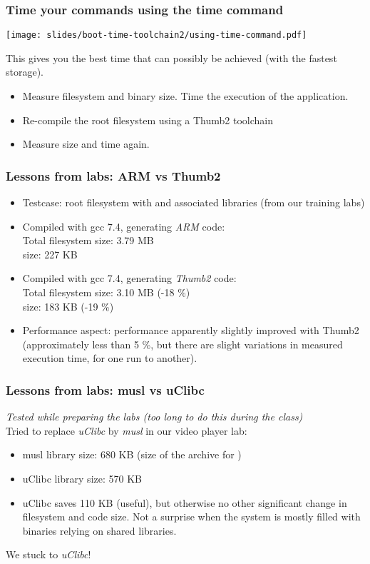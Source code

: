 \begin{frame}
\frametitle{Time your commands using the time command}
\begin{center}
\texttt{[image: slides/boot-time-toolchain2/using-time-command.pdf]}
\end{center}
This gives you the best time that can possibly be achieved (with the fastest storage).
\end{frame}

{
\begin{itemize}
\item Measure filesystem and  binary size. Time
      the execution of the application.
\item Re-compile the root filesystem using a Thumb2 toolchain
\item Measure size and time again.
\end{itemize}
}


\begin{frame}
\frametitle{Lessons from labs: ARM vs Thumb2}
\begin{itemize}
\item Testcase: root filesystem with  and associated
      libraries (from our training labs)
\item Compiled with gcc 7.4, generating {\em ARM} code:\\
      Total filesystem size: 3.79 MB\\
       size: 227 KB
\item Compiled with gcc 7.4, generating {\em Thumb2} code:\\
      Total filesystem size: 3.10 MB (-18 \%)\\
       size: 183 KB (-19 \%)
\item Performance aspect: performance apparently slightly improved with Thumb2
      (approximately less than 5 \%, but there are slight variations in measured
      execution time, for one run to another).
\end{itemize}
\end{frame}

\begin{frame}
\frametitle{Lessons from labs: musl vs uClibc}
{\em Tested while preparing the labs (too long to do this during the
class)}\\

Tried to replace {\em uClibc} by {\em musl} in our video player lab:
\begin{itemize}
   \item musl library size: 680 KB (size of the  archive for )
   \item uClibc library size: 570 KB
   \item uClibc saves 110 KB (useful), but otherwise no other significant change
    in filesystem and code size. Not a surprise when the system is mostly filled
    with binaries relying on shared libraries.
\end{itemize}
We stuck to {\em uClibc}!
\end{frame}
